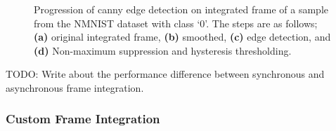 \begin{figure}[htb]%
    \centering
    \qquad
    \qquad
    \qquad
    \caption{Progression of canny edge detection on integrated frame of a sample from the NMNIST dataset with class `0'. The steps are as follows; \textbf{(a)} original integrated frame, \textbf{(b)} smoothed, \textbf{(c)} edge detection, and \textbf{(d)} Non-maximum suppression and hysteresis thresholding.}%
    \label{fig:canny_edge_detection_nmnist}%
\end{figure}

\color{red} TODO: Write about the performance difference between synchronous and asynchronous frame integration. \color{black}

\subsubsection{Custom Frame Integration}

